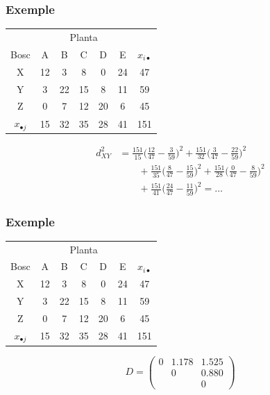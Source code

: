 \documentclass[12pt,t]{beamer}
\theoremstyle{plain}
\theoremstyle{definition}
\begin{document}
\begin{frame}
\frametitle{Exemple}
\vspace*{-3ex}

\begin{center}
\begin{tabular}{c|ccccc|c}
\multicolumn{1}{c}{} & \multicolumn{5}{c}{Planta} & \\
Bosc & A & B & C & D & E & $x_{i\bullet}$ \\ \hline
X & 12 & 3 & 8 & 0 & 24 & 47  \\
Y & 3 & 22 & 15 & 8 & 11  &  59  \\
Z & 0 & 7 & 12 & 20 & 6 & 45 \\\hline
$x_{\bullet j}$ & 15 & 32 & 35 & 28 & 41 & 151\\ \hline 
\end{tabular}
\end{center}

$$
\begin{array}{rl}
d_{XY}^2 &\displaystyle =\frac{151}{15}\Big(\frac{12}{47}-\frac{3}{59}\Big)^2+
\frac{151}{32}\Big(\frac{3}{47}-\frac{22}{59}\Big)^2\\[2ex]
&\displaystyle \qquad +
\frac{151}{35}\Big(\frac{8}{47}-\frac{15}{59}\Big)^2+
\frac{151}{28}\Big(\frac{0}{47}-\frac{8}{59}\Big)^2\\[2ex]
&\displaystyle \qquad +
\frac{151}{41}\Big(\frac{24}{47}-\frac{11}{59}\Big)^2=\ldots
\end{array}
$$

\end{frame}


\begin{frame}
\frametitle{Exemple}
\vspace*{-3ex}

\begin{center}
\begin{tabular}{c|ccccc|c}
\multicolumn{1}{c}{} & \multicolumn{5}{c}{Planta} & \\
Bosc & A & B & C & D & E & $x_{i\bullet}$ \\ \hline
X & 12 & 3 & 8 & 0 & 24 & 47  \\
Y & 3 & 22 & 15 & 8 & 11  &  59  \\
Z & 0 & 7 & 12 & 20 & 6 & 45 \\\hline
$x_{\bullet j}$ & 15 & 32 & 35 & 28 & 41 & 151\\ \hline 
\end{tabular}
\end{center}
\medskip

$$
D=\left(\begin{array}{ccc}
0 & 1.178 & 1.525 \\
 & 0 & 0.880\\
 & & 0
 \end{array}\right) 
$$

\end{frame}
\end{document}
